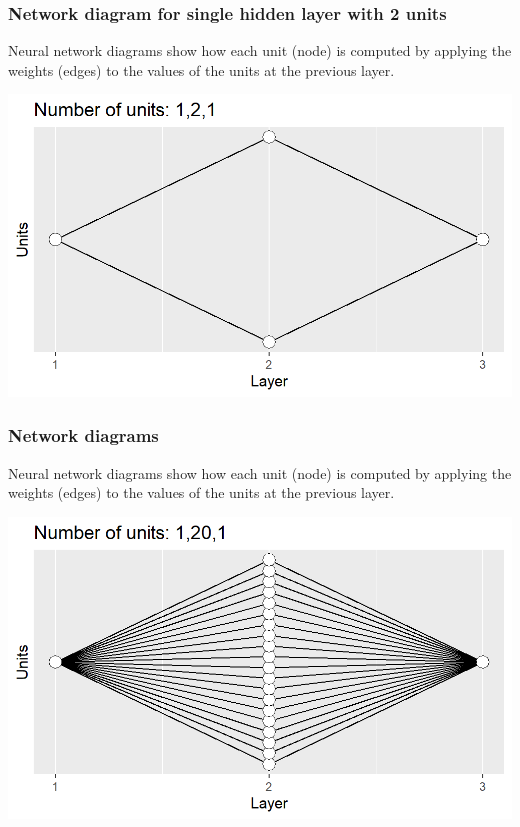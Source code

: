 \documentclass{beamer}
\begin{document}
\begin{frame}
  \frametitle{Network diagram for single hidden layer with 2 units}
Neural network diagrams show how each unit (node) is computed by
applying the weights (edges) to the values of the units at the previous
layer.

\includegraphics[width=\textwidth]{figure-architecture-reg2}
\end{frame}

\begin{frame}
  \frametitle{Network diagrams}
  Neural network
  diagrams show how each unit (node) is computed by applying the
  weights (edges) to the values of the units at the previous layer.

\includegraphics[width=\textwidth]{figure-architecture-reg20}
\end{frame}
\end{document}
